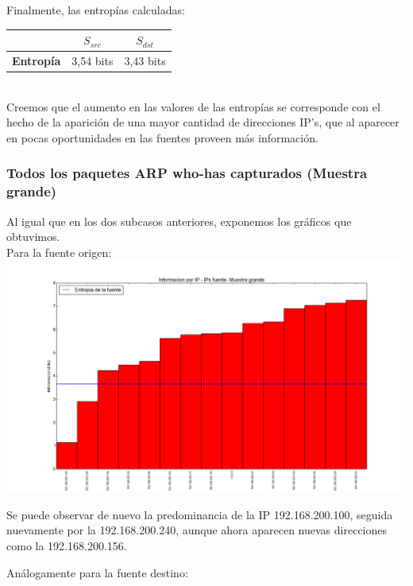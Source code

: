 \indent Finalmente, las entropías calculadas:\\

\begin{centering}
	\begin{tabular}{ | c | c | c |} \hline
	   & \textbf{$S_{src}$} & \textbf{$S_{dst}$} \\ \hline
	  	\textbf{Entropía} & 3,54 bits & 3,43 bits \\ \hline
	\end{tabular}
\end{centering}\\


\indent Creemos que el aumento en las valores de las entropías se corresponde con el hecho de la aparición de una mayor cantidad de direcciones IP's, que al aparecer en pocas oportunidades en las fuentes proveen más información.\\


\subsubsection{Todos los paquetes ARP who-has capturados (Muestra grande)}

\indent \indent Al igual que en los dos subcasos anteriores, exponemos los gráficos que obtuvimos.\\
\indent Para la fuente origen:\\


\includegraphics[scale=0.5,clip=true,trim=100 0 0 0]{graphics/laburo_grande_src.png}

\indent Se puede observar de nuevo la predominancia de la IP 192.168.200.100, seguida nuevamente por la 192.168.200.240, aunque ahora aparecen nuevas direcciones como la 192.168.200.156.

\indent Análogamente para la fuente destino:\\

